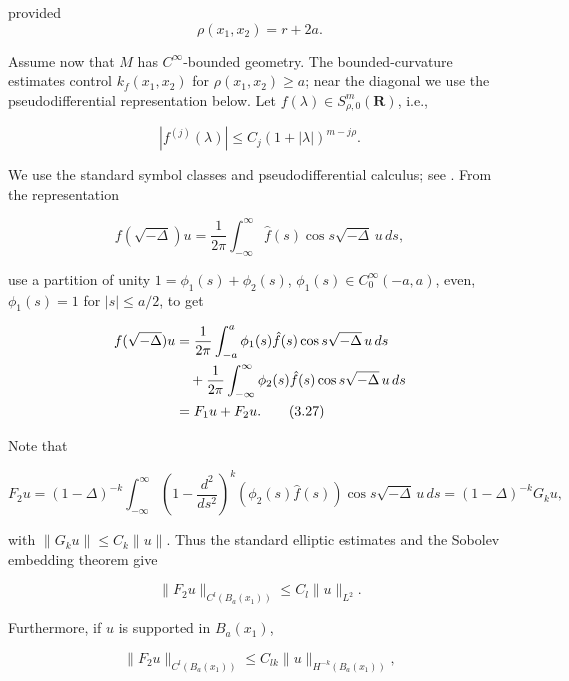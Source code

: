 provided
\begin{equation}\tag{3.24}
\rho(x_1,x_2)=r+2a.
\end{equation}

Assume now that $M$ has $C^\infty$-bounded geometry. The bounded-curvature estimates
control $k_f(x_1,x_2)$ for $\rho(x_1,x_2)\ge a$; near the diagonal we use the
pseudodifferential representation below. Let $f(\lambda)\in S_{\rho,0}^m(\mathbf R)$, i.e.,

\begin{equation}\tag{3.25}
|f^{(j)}(\lambda)|\le C_j(1+|\lambda|)^{m-j\rho}.
\end{equation}

We use the standard symbol classes and pseudodifferential calculus; see
\cite[Chapter~II]{cgt-taylor-pdo}. From the representation

\begin{equation}\tag{3.26}
f(\sqrt{-\Delta})u=\frac{1}{2\pi}\int_{-\infty}^{\infty}\hat f(s)\cos s\sqrt{-\Delta}\,u\,ds,
\end{equation}

use a partition of unity $1=\phi_1(s)+\phi_2(s)$, $\phi_1(s)\in C_0^\infty(-a,a)$, even, $\phi_1(s)=1$ for $|s|\le a/2$, to get

\begin{align}
f(\sqrt{-\Delta})u
&=\frac{1}{2\pi}\int_{-a}^{a}\phi_1(s)\hat f(s)\cos s\sqrt{-\Delta}\,u\,ds \notag\\
&\quad +\frac{1}{2\pi}\int_{-\infty}^{\infty}\phi_2(s)\hat f(s)\cos s\sqrt{-\Delta}\,u\,ds \notag\\
&=F_1u+F_2u.
\tag{3.27}
\end{align}

Note that

\begin{equation}\tag{3.28}
F_2u=(1-\Delta)^{-k}\int_{-\infty}^{\infty}
\left(1-\frac{d^2}{ds^2}\right)^k(\phi_2(s)\hat f(s))\cos s\sqrt{-\Delta}\,u\,ds
=(1-\Delta)^{-k}G_ku,
\end{equation}

with $\|G_ku\|\le C_k\|u\|$. Thus the standard elliptic estimates and the Sobolev embedding theorem give

\begin{equation}\tag{3.29}
\|F_2u\|_{C^l(B_a(x_1))}\le C_l\|u\|_{L^2}.
\end{equation}

Furthermore, if $u$ is supported in $B_a(x_1)$,

\begin{equation}\tag{3.30}
\|F_2u\|_{C^l(B_a(x_1))}\le C_{lk}\|u\|_{H^{-k}(B_a(x_1))},
\end{equation}

